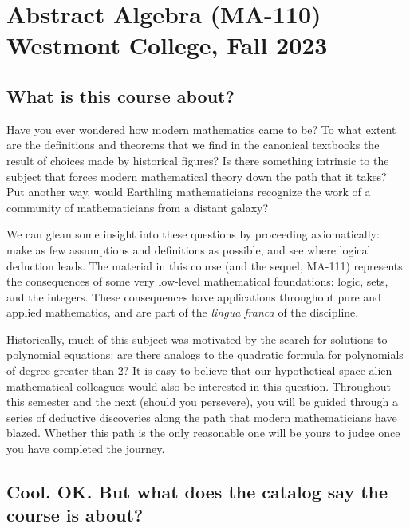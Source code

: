\documentclass[
  twoside]{article}
\author{}
\date{\vspace{-2.5em}}
\begin{document}
\hypertarget{abstract-algebra-ma-110-westmont-college-fall-2023}{%
\section{Abstract Algebra (MA-110) Westmont College, Fall
2023}\label{abstract-algebra-ma-110-westmont-college-fall-2023}}

\hypertarget{what-is-this-course-about}{%
\subsection{What is this course
about?}\label{what-is-this-course-about}}

Have you ever wondered how modern mathematics came to be? To what extent
are the definitions and theorems that we find in the canonical textbooks
the result of choices made by historical figures? Is there something
intrinsic to the subject that forces modern mathematical theory down the
path that it takes? Put another way, would Earthling mathematicians
recognize the work of a community of mathematicians from a distant
galaxy?

We can glean some insight into these questions by proceeding
axiomatically: make as few assumptions and definitions as possible, and
see where logical deduction leads. The material in this course (and the
sequel, MA-111) represents the consequences of some very low-level
mathematical foundations: logic, sets, and the integers. These
consequences have applications throughout pure and applied mathematics,
and are part of the \textit{lingua franca} of the discipline.

Historically, much of this subject was motivated by the search for
solutions to polynomial equations: are there analogs to the quadratic
formula for polynomials of degree greater than 2? It is easy to believe
that our hypothetical space-alien mathematical colleagues would also be
interested in this question. Throughout this semester and the next
(should you persevere), you will be guided through a series of deductive
discoveries along the path that modern mathematicians have blazed.
Whether this path is the only reasonable one will be yours to judge once
you have completed the journey.

\hypertarget{cool.-ok.-but-what-does-the-catalog-say-the-course-is-about}{%
\subsection{Cool. OK. But what does the catalog say the course is
about?}\label{cool.-ok.-but-what-does-the-catalog-say-the-course-is-about}}
\end{document}
